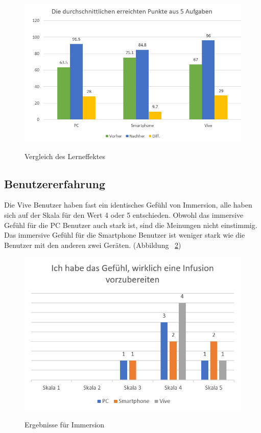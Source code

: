 \begin{figure}[ht]
\vspace*{2.3em}
\centering
\caption{Vergleich des Lerneffektes}
\includegraphics[width= \textwidth]{images/testErgebnisse.png}
\label{fig:testErgebnisse}
\vspace*{1em}
\end{figure}

\subsection{Benutzererfahrung}

Die Vive Benutzer haben fast ein identisches Gefühl von Immersion, alle haben sich auf der Skala für den Wert 4 oder 5 entschieden. Obwohl das immersive Gefühl für die PC Benutzer auch stark ist, sind die Meinungen nicht einstimmig. Das immersive Gefühl für die Smartphone Benutzer ist weniger stark wie die Benutzer mit den anderen zwei Geräten. (Abbildung ~\ref{fig:gefuehlWirklich})

\begin{figure}[ht]
\vspace*{1em}
\centering
\caption{Ergebnisse für Immersion}
\includegraphics[width= \textwidth]{images/gefuehlWirklich.png}
\label{fig:gefuehlWirklich} 
\end{figure}

